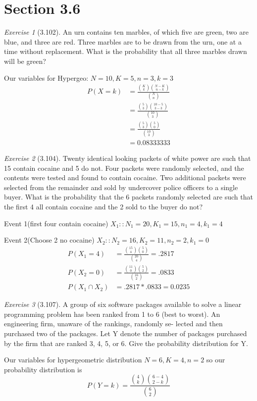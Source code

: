\documentclass[12pt]{amsart}
\makeatletter
\theoremstyle{remark}
\newtheorem*{exercise}{Exercise}%
\renewenvironment{proof}[1][\proofname]{\par\doublespacing
  \pushQED{\qed}%
  \normalfont \topsep6\p@\@plus6\p@\relax
  \list{}{%
    \settowidth{\leftmargin}{\itshape\proofname:\hskip\labelsep}%
    \setlength{\labelwidth}{0pt}%
    \setlength{\itemindent}{-\leftmargin}%
  }%
  \item[\hskip\labelsep\itshape#1\@addpunct{:}]\ignorespaces
}{%
  \popQED\endlist\@endpefalse
  \singlespacing
}
\theoremstyle{mycomment}
\makeatother
\begin{document}
\section*{Section 3.6}
\begin{exercise}[3.102]
An urn contains ten marbles, of which five are green, two are blue, and three are red. Three
marbles are to be drawn from the urn, one at a time without replacement. What is the probability
that all three marbles drawn will be green?
\begin{proof}[Solution]
Our variables for Hypergeo: $N = 10, K = 5, n = 3, k = 3$ 
\begin{align*}
  P(X=k) &= \frac{{K \choose k}{N - K \choose n - k}}{{N \choose n}} \\
         &= \frac{{5 \choose 3}{10 - 5 \choose 3 - 3}}{{10 \choose 3}} \\
         &= \frac{{5 \choose 3}{5 \choose 0}}{{10 \choose 3}} \\
         &= 0.08333333
\end{align*}
\end{proof}
\end{exercise}
\begin{exercise}[3.104] Twenty identical looking packets of white power are such that 15 contain cocaine and 5 do
not. Four packets were randomly selected, and the contents were tested and found to contain
cocaine. Two additional packets were selected from the remainder and sold by undercover
police officers to a single buyer. What is the probability that the 6 packets randomly selected
are such that the first 4 all contain cocaine and the 2 sold to the buyer do not?

\begin{proof}[Solution]
Event 1(first four contain cocaine) $X_1::N_1 = 20, K_1 = 15, n_1 = 4, k_1 = 4$ 

Event 2(Choose 2 no cocaine) $X_2::N_2 = 16, K_2 = 11, n_2 = 2, k_1 = 0$
\begin{align*}
  P(X_1 = 4) &= \frac{{15 \choose 4}{5 \choose 0}}{{20 \choose 4}} = .2817 \\
  P(X_2 = 0) &= \frac{{11 \choose 0}{5 \choose 2}}{{16 \choose 2}} = .0833 \\
  P(X_1 \cap X_2) &= .2817*.0833 = 0.0235
\end{align*}
\end{proof}
\end{exercise}

\begin{exercise}[3.107] A group of six software packages available to solve a linear programming problem has been
ranked from 1 to 6 (best to worst). An engineering firm, unaware of the rankings, randomly se-
lected and then purchased two of the packages. Let Y denote the number of packages purchased
by the firm that are ranked 3, 4, 5, or 6. Give the probability distribution for Y.
\begin{proof}[Solution]
Our variables for hypergeometric distribution $N = 6, K = 4, n = 2$ so our probability distribution is
	$$P(Y=k) = \frac{{4 \choose k}{6 - 4 \choose 2 - k}}{{6 \choose 2}}$$
\end{proof}
\end{exercise}
\end{document}
